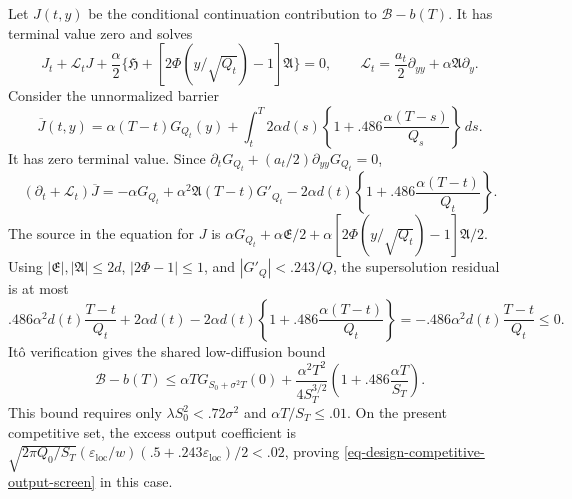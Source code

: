 \documentclass[mnsc]{informs3}
\begin{document}
\begin{APPENDICES}
{Let $J(t,y)$ be the conditional continuation contribution to
$\mathcal B-b(T)$. It has terminal value zero and solves
\[
J_t+\mathscr L_tJ+
\frac\alpha2\{{\mathfrak H}+[2\Phi(y/\sqrt{Q_t})-1]{\mathfrak A}\}=0,
\qquad
\mathscr L_t=\frac{a_t}{2}\partial_{yy}+\alpha {\mathfrak A}\partial_y.
\]
Consider the unnormalized barrier
\[
\overline J(t,y)=\alpha(T-t)G_{Q_t}(y)
+\int_t^T2\alpha d(s)
\left\{1+.486\frac{\alpha(T-s)}{Q_s}\right\}\,ds .
\]
It has zero terminal value. Since
$\partial_tG_{Q_t}+(a_t/2)\partial_{yy}G_{Q_t}=0$,
\[
(\partial_t+\mathscr L_t)\overline J
=-\alpha G_{Q_t}+\alpha^2{\mathfrak A}(T-t)G'_{Q_t}
-2\alpha d(t)\left\{1+.486\frac{\alpha(T-t)}{Q_t}\right\}.
\]
The source in the equation for $J$ is
$\alpha G_{Q_t}+\alpha {\mathfrak E}/2+
\alpha[2\Phi(y/\sqrt{Q_t})-1]{\mathfrak A}/2$.
Using $|{\mathfrak E}|,|{\mathfrak A}|\leq2d$, $|2\Phi-1|\leq1$, and
$|G'_Q|<.243/Q$, the supersolution residual is at most
\[
.486\alpha^2d(t)\frac{T-t}{Q_t}+2\alpha d(t)
-2\alpha d(t)\left\{1+.486\frac{\alpha(T-t)}{Q_t}\right\}
=-.486\alpha^2d(t)\frac{T-t}{Q_t}\leq0.
\]
It\^o verification gives the shared low-diffusion bound
\begin{equation}\label{eq-design-low-diffusion-output}
\mathcal B-b(T)\leq\alpha T G_{S_0+\sigma^2T}(0)
+\frac{\alpha^2T^2}{4S_T^{3/2}}
\left(1+.486\frac{\alpha T}{S_T}\right).
\end{equation}
This bound requires only $\lambda S_0^2<.72\sigma^2$ and
$\alpha T/S_T\leq.01$.
On the present competitive set, the excess output coefficient is
$\sqrt{2\pi Q_0/S_T}(\varepsilon_{\mathrm{loc}}/w)(.5+.243\varepsilon_{\mathrm{loc}})/2<.02$, proving
\eqref{eq-design-competitive-output-screen} in this case.

}
\end{APPENDICES}
\end{document}
